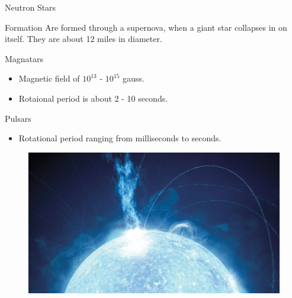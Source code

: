 \documentclass[12pt, aspectratio=169]{beamer}
\begin{document}
\begin{frame}{Neutron Stars}
  
  \begin{block}{Formation}
    Are formed through a supernova, when a giant star collapses in on itself. They are about 12 miles in diameter.
  \end{block}

  \begin{block}{Magnatars}
    \begin{itemize}
    \item Magnetic field of $10^{13}$ - $10^{15}$ gauss.
    \item Rotaional period is about 2 - 10 seconds.
    \end{itemize}
  \end{block}

  \begin{block}{Pulsars}
    \begin{itemize}
    \item Rotational period ranging from milliseconds to seconds. 
    \end{itemize}
  \end{block}

\end{frame}

\begin{frame}
  
\begin{figure}
\includegraphics[width=\textwidth]{softrepeater.jpg}
\end{figure}

\end{frame}
\end{document}
